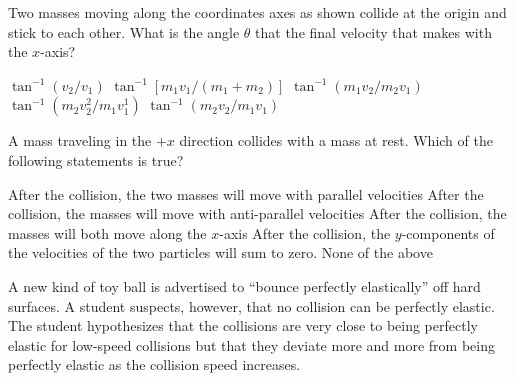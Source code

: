 \documentclass{../../../oss-ap12ibhl-print}
\begin{document}
\begin{questions}
  \question Two masses moving along the coordinates axes as shown collide at the
  origin and stick to each other. What is the angle $\theta$ that the final
  velocity that makes with the $x$-axis?
  
  \begin{minipage}{.4\linewidth}
  \end{minipage}
  \begin{minipage}{.5\linewidth}
    \begin{choices}
      \choice $\tan^{-1}(v_2/v_1)$
      \choice $\tan^{-1}[m_1v_1/(m_1+m_2)]$
      \choice $\tan^{-1}(m_1v_2/m_2v_1)$
      \choice $\tan^{-1}(m_2v_2^2/m_1v_1^1)$
      \choice $\tan^{-1}(m_2v_2/m_1v_1)$
    \end{choices}
  \end{minipage}

  \question A mass traveling in the $+x$ direction collides with a mass at rest.
  Which of the following statements is true?
  \begin{choices}
    \choice After the collision, the two masses will move with parallel
    velocities
    \choice After the collision, the masses will move with anti-parallel
    velocities
    \choice After the collision, the masses will both move along the $x$-axis
    \choice After the collision, the $y$-components of the velocities of the two
    particles will sum to zero.
    \choice None of the above
  \end{choices}
  \newpage

  \question A new kind of toy ball is advertised to ``bounce perfectly
  elastically'' off hard surfaces. A student suspects, however, that no
  collision can be perfectly elastic. The student hypothesizes that the
  collisions are very close to being perfectly elastic for low-speed collisions
  but that they deviate more and more from being perfectly elastic as the
  collision speed increases.
  \begin{parts}

\end{parts}
\end{questions}
\end{document}
